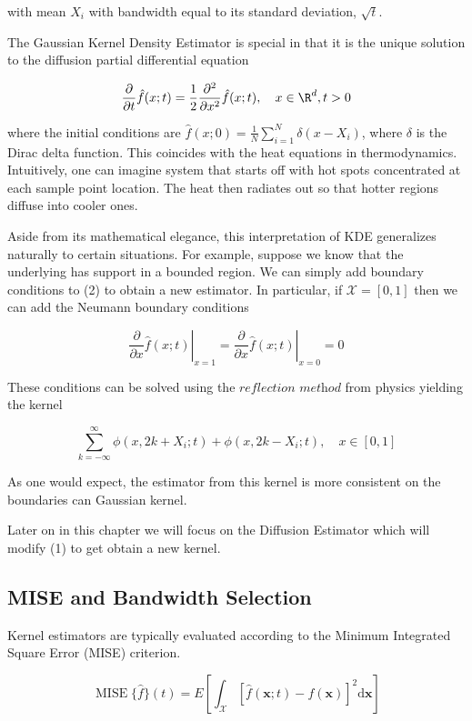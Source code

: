 with mean $X_i$ with bandwidth equal to its standard deviation, $\sqrt{t}$.

The Gaussian Kernel Density Estimator is special in that it is the unique solution to the diffusion partial differential equation

\begin{equation}
\frac{\partial}{\partial t} \hat{f}(x ; t)=\frac{1}{2} \frac{\partial^{2}}{\partial x^{2}} \hat{f}(x ; t), \quad x \in \R^d, t>0
\end{equation}

where the initial conditions are $\hat{f}(x ; 0) = \tfrac{1}{N} \sum_{i=1}^N \delta(x - X_i)$, where $\delta$ is the Dirac delta function. This coincides with the heat equations in thermodynamics. Intuitively, one can imagine system that starts off with hot spots concentrated at each sample point location. The heat then radiates out so that hotter regions diffuse into cooler ones. 

Aside from its mathematical elegance, this interpretation of KDE generalizes naturally to certain situations. For example, suppose we know that the underlying has support in a bounded region. We can simply add boundary conditions to (2) to obtain a new estimator. In particular, if $\mathscr{X} = [0, 1]$ then we can add the Neumann boundary conditions

$$
\left.\frac{\partial}{\partial x} \hat{f}(x ; t)\right|_{x=1}=\left.\frac{\partial}{\partial x} \hat{f}(x ; t)\right|_{x=0}=0
$$

These conditions can be solved using the $\textit{reflection method}$ from physics yielding the kernel

$$
\sum_{k=-\infty}^{\infty} \phi\left(x, 2 k+X_{i} ; t\right)+\phi\left(x, 2 k-X_{i} ; t\right), \quad x \in[0,1]
$$

As one would expect, the estimator from this kernel is more consistent on the boundaries can Gaussian kernel.

Later on in this chapter we will focus on the Diffusion Estimator\cite{botev2010kernel} which will modify (1) to get obtain a new kernel.

\subsection{MISE and Bandwidth Selection}

Kernel estimators are typically evaluated according to the Minimum Integrated Square Error (MISE) criterion. 

$$
\operatorname{MISE}\{\hat{f}\}(t)=E \left[ \int_{\mathscr{X}}\left[\hat{f}(\boldsymbol{x}; t)-f(\boldsymbol{x})\right]^{2} \mathrm{d} \boldsymbol{x} \right]
$$

